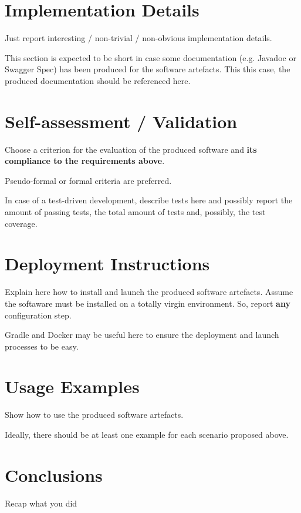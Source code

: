 \documentclass{scrartcl}
\begin{document}
\section{Implementation Details}

Just report interesting / non-trivial / non-obvious implementation details.

This section is expected to be short in case some documentation (e.g. Javadoc or Swagger Spec) has been produced for the software artefacts.
%
This this case, the produced documentation should be referenced here.

\section{Self-assessment / Validation}

Choose a criterion for the evaluation of the produced software and \textbf{its compliance to the requirements above}.

Pseudo-formal or formal criteria are preferred.

In case of a test-driven development, describe tests here and possibly report the amount of passing tests, the total amount of tests and, possibly, the test coverage.

\section{Deployment Instructions}

Explain here how to install and launch the produced software artefacts.
%
Assume the softaware must be installed on a totally virgin environment.
%
So, report \textbf{any} configuration step.

Gradle and Docker may be useful here to ensure the deployment and launch processes to be easy.

\section{Usage Examples}

Show how to use the produced software artefacts.

Ideally, there should be at least one example for each scenario proposed above.

\section{Conclusions}

Recap what you did
\end{document}
